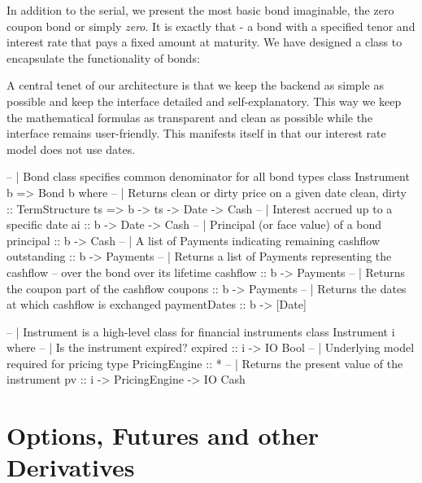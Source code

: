 In addition to the serial, we present the most basic bond imaginable, the zero 
coupon bond or simply \emph{zero}. It is exactly that - a bond with a specified 
tenor and interest rate that pays a fixed amount at maturity. We have designed 
a class to encapsulate the functionality of bonds:


A central tenet of our architecture is that we keep the backend
as simple as possible and keep the interface detailed and 
self-explanatory. This way we keep the mathematical formulas as transparent
and clean as possible while the interface remains user-friendly. This
manifests itself in that our interest rate model does not use dates.

\begin{hscode}
-- | Bond class specifies common denominator for all bond types 
class Instrument b => Bond b where
  -- | Returns clean or dirty price on a given date
  clean, dirty :: TermStructure ts => b -> ts -> Date -> Cash
  -- | Interest accrued up to a specific date
  ai           :: b -> Date -> Cash
  -- | Principal (or face value) of a bond
  principal    :: b -> Cash
  -- | A list of Payments indicating remaining cashflow
  outstanding  :: b -> Payments
  -- | Returns a list of Payments representing the cashflow
  -- over the bond over its lifetime
  cashflow     :: b -> Payments
  -- | Returns the coupon part of the cashflow
  coupons      :: b -> Payments
  -- | Returns the dates at which cashflow is exchanged
  paymentDates :: b -> [Date]
\end{hscode}


\begin{hscode}
-- | Instrument is a high-level class for financial instruments
class Instrument i where
  -- | Is the instrument expired?
  expired :: i -> IO Bool
  -- | Underlying model required for pricing
  type PricingEngine :: *
  -- | Returns the present value of the instrument
  pv           :: i -> PricingEngine -> IO Cash
\end{hscode}



\section{Options, Futures and other Derivatives}

